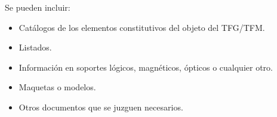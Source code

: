 \documentclass[00-Trabajo_Final.tex]{subfiles}
\begin{document}
\renewcommand{\NombreDocumento}{Otros anexos}

\renewcommand{\contentsname}{Índice \NombreDocumento}
\localtableofcontents
\newpage

Se pueden incluir:
\begin{itemize}[noitemsep,topsep=0pt]
    \item Catálogos de los elementos constitutivos del objeto del TFG/TFM.
    \item Listados.
    \item Información en soportes lógicos, magnéticos, ópticos o cualquier otro.
    \item Maquetas o modelos.
    \item Otros documentos que se juzguen necesarios.
\end{itemize}

\cleardoublepage
\end{document}
